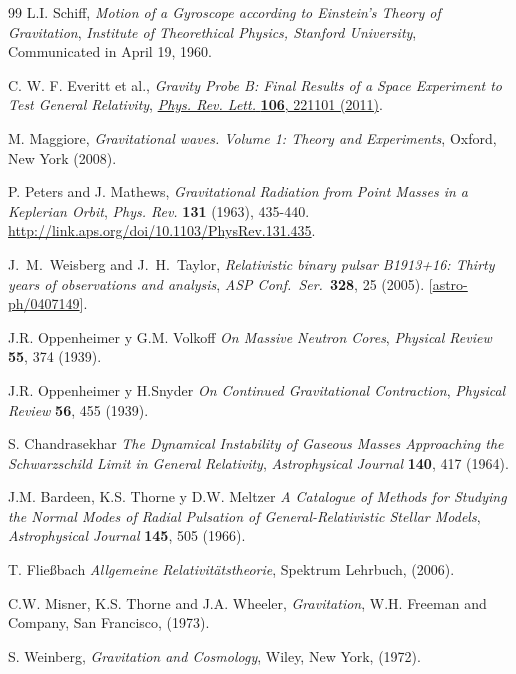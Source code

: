 \begin{thebibliography}{99}
L.I. Schiff,  \textit{Motion of a Gyroscope according to Einstein's Theory of Gravitation},
  \textsl{Institute of Theorethical Physics, Stanford University}, Communicated in April 19, 1960.



C. W. F. Everitt et al.,  \textit{Gravity Probe B: Final Results of a Space Experiment to Test General Relativity}, \href{http://dx.doi.org/10.1103/PhysRevLett.106.221101}{ \textit{Phys. Rev. Lett.}   \textbf{106}, 221101 (2011)}.

 M. Maggiore,   \textit{Gravitational waves. Volume 1: Theory and Experiments}, Oxford, New York (2008).

P. Peters and J. Mathews,  \textit{Gravitational Radiation from Point Masses in a Keplerian Orbit},   \textsl{Phys. Rev.}   \textbf{131} (1963), 435-440. \url{http://link.aps.org/doi/10.1103/PhysRev.131.435}.

 J.~M.~Weisberg and J.~H.~Taylor,  \textit{Relativistic binary pulsar B1913+16: Thirty years of observations and analysis},   \textsl{ASP Conf.\ Ser.}\    \textbf{328}, 25 (2005). [\href{http://arxiv.org/abs/astro-ph/0407149}{astro-ph/0407149}].

 J.R. Oppenheimer y G.M. Volkoff  \textit{On Massive Neutron Cores},   \textsl{Physical Review}   \textbf{55}, 374 (1939).

 J.R. Oppenheimer y H.Snyder  \textit{On Continued Gravitational Contraction},   \textsl{Physical Review}   \textbf{56}, 455 (1939).

 S. Chandrasekhar  \textit{The Dynamical Instability of Gaseous Masses Approaching the Schwarzschild Limit in General Relativity},   \textsl{Astrophysical Journal}   \textbf{140}, 417 (1964).

 J.M. Bardeen, K.S. Thorne y D.W. Meltzer  \textit{A Catalogue of Methods for Studying the Normal Modes of Radial Pulsation of General-Relativistic Stellar Models},   \textsl{Astrophysical Journal}   \textbf{145}, 505 (1966).

 T. Flie\ss bach  \textit{Allgemeine Relativit\"atstheorie}, Spektrum Lehrbuch, (2006).

 C.W. Misner, K.S. Thorne and J.A. Wheeler,  \textit{Gravitation},
W.H. Freeman and Company, San Francisco, (1973).

 S. Weinberg,  \textit{Gravitation and Cosmology}, Wiley, New
York, (1972).


\end{thebibliography}

